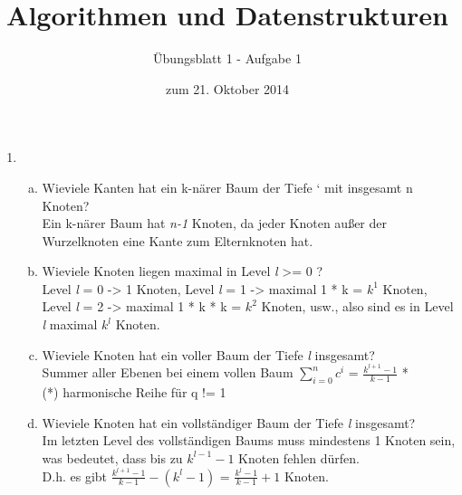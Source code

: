 \documentclass[a4paper]{scrartcl}
\title{Algorithmen und Datenstrukturen}
\subtitle{Übungsblatt 1 - Aufgabe 1}
\author{
}
\date{zum 21. Oktober 2014}
\begin{document}
\maketitle

\begin{enumerate}
    \item
        \begin{enumerate}[(a)]
            \item
            Wieviele Kanten hat ein k-närer Baum der Tiefe ` mit insgesamt n Knoten?\\
            
			Ein k-närer Baum hat \textit{n-1} Knoten, da jeder Knoten außer der Wurzelknoten eine Kante 
			zum Elternknoten hat.\\
            
            \item
            Wieviele Knoten liegen maximal in Level \textit{l} >= 0 ?\\
            
            Level \textit{l} = 0 -> 1 Knoten, Level \textit{l} = 1 -> maximal 1 * k = $k^1$ Knoten,\\
            Level \textit{l} = 2 -> maximal 1 * k * k = $k^2$ Knoten, usw., also sind es in Level \textit{l}
            maximal $k^l$ Knoten.\\
            
            \item
            Wieviele Knoten hat ein voller Baum der Tiefe \textit{l} insgesamt?\\
            
            Summer aller Ebenen bei einem vollen Baum $\sum_{i=0}^n c^i$ = $\frac{k^{l+1}-1}{k-1}$ *\\
            (*) harmonische Reihe für q != 1\\
            
            \item
            Wieviele Knoten hat ein vollständiger Baum der Tiefe \textit{l} insgesamt?\\
			
			Im letzten Level des vollständigen Baums muss mindestens 1 Knoten sein, was bedeutet, 
			dass bis zu $k^{l-1}-1$ Knoten fehlen dürfen. \\
			D.h. es gibt $\frac{k^{l+1}-1}{k-1}-(k^{l}-1)$ = $\frac{k^{l}-1}{k-1}+1$ Knoten.
        \end{enumerate}
        
        
\end{enumerate}
\end{document}
